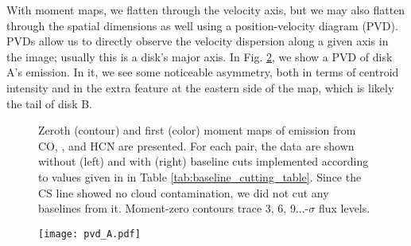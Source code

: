 With moment maps, we flatten through the velocity axis, but we may also flatten through the spatial dimensions as well using a position-velocity diagram (PVD). PVDs allow us to directly observe the velocity dispersion along a given axis in the image; usually this is a disk's major axis. In Fig. \ref{fig:pv_diag}, we show a PVD of disk A's \hco{} emission. In it, we see some noticeable asymmetry, both in terms of centroid intensity and in the extra feature at the eastern side of the map, which is likely the tail of disk B.


\begin{figure}[h]
  \hspace*{\fill}%
  \vfill%
  \vfill%
  \vfill%
  \hspace*{\fill}%
  \caption{Zeroth (contour) and first (color) moment maps of emission from CO, \hco, and HCN are presented. For each pair, the data are shown without (left) and with (right) baseline cuts implemented according to values given in in Table \ref{tab:baseline_cutting_table}. Since the CS line showed no cloud contamination, we did not cut any baselines from it. Moment-zero contours trace 3, 6, 9...-$\sigma$ flux levels.}
  \label{fig:baseline_cuts}
\end{figure}




\begin{figure}
  \centering
  \texttt{[image: pvd\_A.pdf]}
    \label{fig:pv_diag}
\end{figure}






